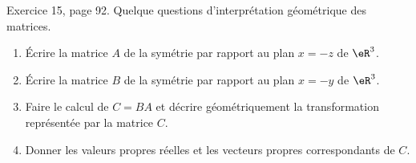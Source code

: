 \begin{exercice}\label{exoLineraire0038}

	Exercice 15, page 92. Quelque questions d'interprétation géométrique des matrices.
	\begin{enumerate}

		\item
			Écrire la matrice $A$ de la symétrie par rapport au plan $x=-z$ de $\eR^3$.

		\item
			Écrire la matrice $B$ de la symétrie par rapport au plan $x=-y$ de $\eR^3$.

		\item
			Faire le calcul de $C=BA$ et décrire géométriquement la transformation représentée par la matrice $C$.

		\item
			Donner les valeurs propres réelles et les vecteurs propres correspondants de $C$.
	\end{enumerate}
	

\end{exercice}
